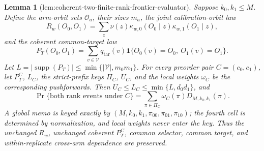 \documentclass{article}
\newtheorem{lemma}{Lemma}
\begin{document}
\begin{lemma}[lem:coherent-two-finite-rank-frontier-evaluator]\label{lem:coherent-two-finite-rank-frontier-evaluator}
Suppose \(k_0,k_1\le M\). Define the arm-orbit sets \(\mathcal O_a\), their sizes \(m_a\), the joint calibration-orbit law
\[
R_w(O_0,O_1)=\sum_z\nu(z)\kappa_{w,0}(O_0\mid z)\kappa_{w,1}(O_1\mid z),
\]
and the coherent common-target law
\[
P_T(O_0,O_1)=\sum_{v\in\mathcal V}q_{\mathrm{tar}}(v)
\mathbf 1\{O_0(v)=O_0,\ O_1(v)=O_1\}.
\]
Let \(L=|\operatorname{supp}(P_T)|\le\min\{|\mathcal V|,m_0m_1\}\). For every preorder pair \(C=(c_0,c_1)\), let \(P_T^C\), \(L_C\), the strict-prefix keys \(\Pi_C\), \(U_C\), and the local weights \(\omega_C\) be the corresponding pushforwards. Then \(U_C\le L_C\le\min\{L,d_0d_1\}\), and
\[
\Pr\{\text{both rank events under }C\}
=\sum_{\pi\in\Pi_C}\omega_C(\pi)D_{M,k_0,k_1}(\pi).
\]
A global memo is keyed exactly by \((M,k_0,k_1,\pi_{00},\pi_{01},\pi_{10})\); the fourth cell is determined by normalization, and local weights never enter the key. Thus the unchanged \(R_w\), unchanged coherent \(P_T^C\), common selector, common target, and within-replicate cross-arm dependence are preserved.


\end{lemma}
\end{document}
